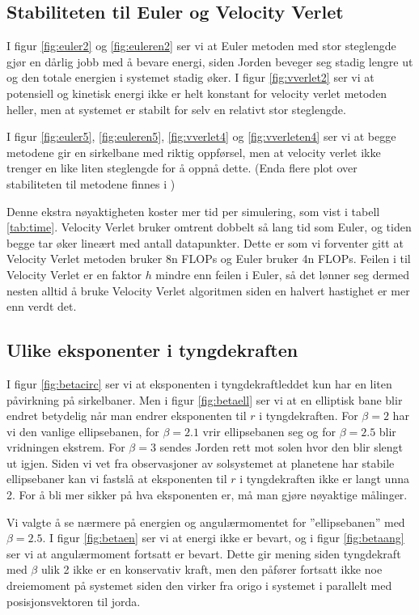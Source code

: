 \documentclass[reprint,english,notitlepage]{revtex4-1}
\begin{document}
\subsection{Stabiliteten til Euler og Velocity Verlet}
	I figur \ref{fig:euler2} og \ref{fig:euleren2} ser vi at Euler metoden med stor steglengde gjør en dårlig jobb med å bevare energi, siden Jorden beveger seg stadig lengre ut og den totale energien i systemet stadig øker. I figur \ref{fig:vverlet2} ser vi at potensiell og kinetisk energi ikke er helt konstant for velocity verlet metoden heller, men at systemet er stabilt for selv en relativt stor steglengde.
	
	I figur \ref{fig:euler5}, \ref{fig:euleren5}, \ref{fig:vverlet4} og \ref{fig:vverleten4} ser vi at begge metodene gir en sirkelbane med riktig oppførsel, men at velocity verlet ikke trenger en like liten steglengde for å oppnå dette. (Enda flere plot over stabiliteten til metodene finnes i \cite{myRepo})
	
	Denne ekstra nøyaktigheten koster mer tid per simulering, som vist i tabell \ref{tab:time}. Velocity Verlet bruker omtrent dobbelt så lang tid som Euler, og tiden begge tar øker lineært med antall datapunkter. Dette er som vi forventer gitt at Velocity Verlet metoden bruker 8n FLOPs og Euler bruker 4n FLOPs. Feilen i til Velocity Verlet er en faktor $h$ mindre enn feilen i Euler, så det lønner seg dermed nesten alltid å bruke Velocity Verlet algoritmen siden en halvert hastighet er mer enn verdt det.

\subsection{Ulike eksponenter i tyngdekraften}
	I figur \ref{fig:betacirc} ser vi at eksponenten i tyngdekraftleddet kun har en liten påvirkning på sirkelbaner. Men i figur \ref{fig:betaell} ser vi at en elliptisk bane blir endret betydelig når man endrer eksponenten til $r$ i tyngdekraften. For $\beta = 2$ har vi den vanlige ellipsebanen, for $\beta = 2.1$ vrir ellipsebanen seg og for $\beta = 2.5$ blir vridningen ekstrem. For $\beta = 3$ sendes Jorden rett mot solen hvor den blir slengt ut igjen. Siden vi vet fra observasjoner av solsystemet at planetene har stabile ellipsebaner kan vi fastslå at eksponenten til $r$ i tyngdekraften ikke er langt unna 2. For å bli mer sikker på hva eksponenten er, må man gjøre nøyaktige målinger.
	
	Vi valgte å se nærmere på energien og angulærmomentet for ''ellipsebanen'' med $\beta = 2.5$. I figur \ref{fig:betaen} ser vi at energi ikke er bevart, og i figur \ref{fig:betaang} ser vi at angulærmoment fortsatt er bevart. Dette gir mening siden tyngdekraft med $\beta$ ulik 2 ikke er en konservativ kraft, men den påfører fortsatt ikke noe dreiemoment på systemet siden den virker fra origo i systemet i parallelt med posisjonsvektoren til jorda.
	
\end{document}
